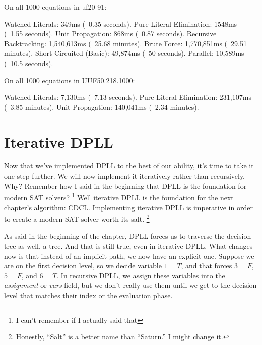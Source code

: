\documentclass[../main.tex]{subfiles}
\begin{document}
\begin{FVerbatim}
On all 1000 equations in uf20-91:

Watched Literals:          349ms (~0.35 seconds).
Pure Literal Elimination:  1548ms (~1.55 seconds).
Unit Propagation:          868ms (~0.87 seconds).
Recursive Backtracking:    1,540,613ms (~25.68 minutes).
Brute Force:               1,770,851ms (~29.51 minutes).
Short-Circuited (Basic):   49,874ms (~50 seconds).
Parallel:                  10,589ms (~10.5 seconds).

On all 1000 equations in UUF50.218.1000:

Watched Literals:         7,130ms (~7.13 seconds).
Pure Literal Elimination: 231,107ms (~3.85 minutes).
Unit Propagation:         140,041ms (~2.34 minutes).
\end{FVerbatim}

\section{Iterative DPLL}

Now that we've implemented DPLL to the best of our ability, it's time to 
take it one step further. We will now implement it iteratively rather than 
recursively. Why? Remember how I said in the beginning that DPLL is the foundation 
for modern SAT solvers?
\footnote{I can't remember if I actually said that}
Well iterative DPLL is the foundation for the next chapter's algorithm: CDCL.
Implementing iterative DPLL is imperative in order to create a modern SAT solver
worth its salt.
\footnote{Honestly, ``Salt'' is a better name than ``Saturn.'' I might change it.}

As said in the beginning of the chapter, DPLL forces us to traverse the decision 
tree as well, a tree. And that is still true, even in iterative DPLL. What changes 
now is that instead of an implicit path, we now have an explicit one. Suppose we 
are on the first decision level, so we decide variable $1 = T$, and that forces 
$3 = F$, $5 = F$, and $6 = T$. In recursive DPLL, we assign these variables into 
the \textit{assignment} or \textit{vars} field, but we don't really use them until 
we get to the decision level that matches their index or the evaluation phase. 
\end{document}
